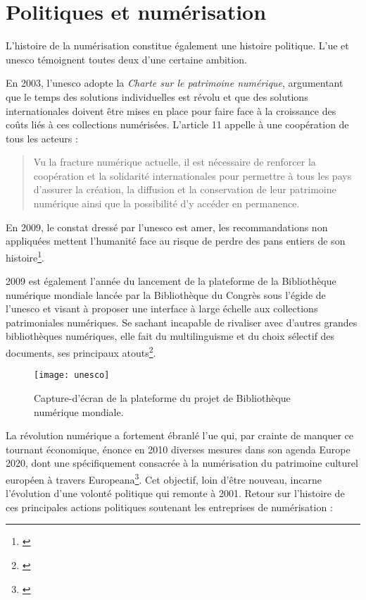 \section{Politiques et numérisation}\label{politique}

L'histoire de la numérisation constitue également une histoire politique. L'\gls{ue} et \gls{unesco} témoignent toutes deux d'une certaine ambition.

En 2003, l'\gls{unesco} adopte la \textit{Charte sur le patrimoine numérique}, argumentant que le temps des solutions individuelles est révolu et que des solutions internationales doivent être mises en place pour faire face à la croissance des coûts liés à ces collections numérisées. L'article 11 appelle à une coopération de tous les acteurs :
\begin{quotation}
Vu la fracture numérique actuelle, il est nécessaire de renforcer la coopération et la solidarité internationales pour permettre à tous les pays d'assurer la création, la diffusion et la conservation de leur patrimoine numérique ainsi que la possibilité d'y accéder en permanence.
\end{quotation}
En 2009, le constat dressé par l'\gls{unesco} est amer, les recommandations non appliquées mettent l'humanité face au risque de perdre des pans entiers de son histoire\footnote{\cite{association_pour_le_patrimoine_naturel_et_culturel_du_canton_de_vaud_patrimoine_2012}}.

2009 est également l'année du lancement de la plateforme de la Bibliothèque numérique mondiale lancée par la Bibliothèque du Congrès sous l'égide de l'\gls{unesco} et visant à proposer une interface à large échelle aux collections patrimoniales numériques. Se sachant incapable de rivaliser avec d'autres grandes bibliothèques numériques, elle fait du multilinguisme et du choix sélectif des documents, ses principaux atouts\footnote{\cite{dufrene_numerisation_2013}}. 

\begin{figure}[H]%
\centering
\texttt{[image: unesco]}
\caption{Capture-d'écran de la plateforme du projet de Bibliothèque numérique mondiale.}
\end{figure}

La révolution numérique a fortement ébranlé l'\gls{ue} qui, par crainte de manquer ce tournant économique, énonce en 2010 diverses mesures dans son agenda Europe 2020, dont une spécifiquement consacrée à la numérisation du patrimoine culturel européen à travers Europeana\footnote{\cite{coutts_stepping_2017}}. Cet objectif, loin d'être nouveau, incarne l'évolution d'une volonté politique qui remonte à 2001. Retour sur l'histoire de ces principales actions politiques soutenant les entreprises de numérisation :

